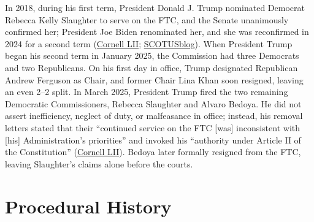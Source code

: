 \documentclass[12pt]{article}
\begin{document}
In 2018, during his first term, President Donald J. Trump nominated Democrat Rebecca Kelly Slaughter to serve on the FTC, and the Senate unanimously confirmed her; President Joe Biden renominated her, and she was reconfirmed in 2024 for a second term (\href{https://www.law.cornell.edu/supremecourt/text/25-332}{Cornell LII}; \href{https://www.scotusblog.com/2026/06/court-allows-trump-to-fire-ftc-commissioner-and-overturns-major-restraint-on-presidential-power/}{SCOTUSblog}). When President Trump began his second term in January 2025, the Commission had three Democrats and two Republicans. On his first day in office, Trump designated Republican Andrew Ferguson as Chair, and former Chair Lina Khan soon resigned, leaving an even 2--2 split. In March 2025, President Trump fired the two remaining Democratic Commissioners, Rebecca Slaughter and Alvaro Bedoya. He did not assert inefficiency, neglect of duty, or malfeasance in office; instead, his removal letters stated that their ``continued service on the FTC [was] inconsistent with [his] Administration's priorities'' and invoked his ``authority under Article II of the Constitution'' (\href{https://www.law.cornell.edu/supremecourt/text/25-332}{Cornell LII}). Bedoya later formally resigned from the FTC, leaving Slaughter's claims alone before the courts.

\section{Procedural History}
\end{document}
